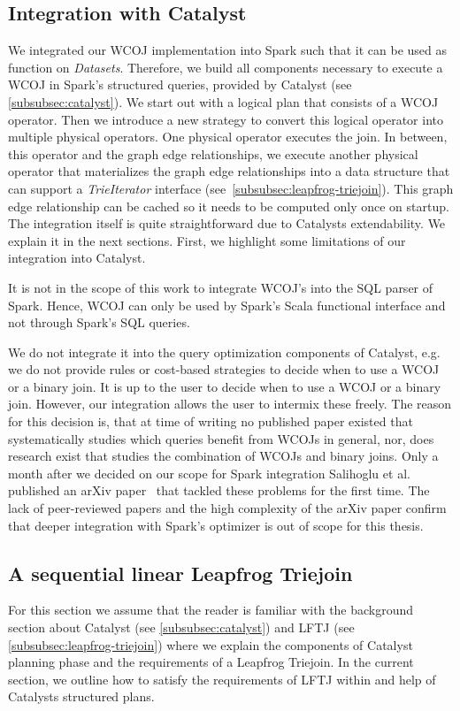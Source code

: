 \subsection{Integration with Catalyst} \label{ssec:integration-with-catalyst}
We integrated our \textsc{WCOJ} implementation into Spark such that it can be used as function on \textit{Datasets}.
Therefore, we build all components necessary to execute a \textsc{WCOJ} in Spark's structured queries, provided by Catalyst (see
\cref{subsubsec:catalyst}).
We start out with a logical plan that consists of a \textsc{WCOJ} operator.
Then we introduce a new strategy to convert this logical operator into multiple physical operators.
One physical operator executes the join.
In between, this operator and the graph edge relationships, we execute another physical operator that materializes
the graph edge relationships into a data structure that can support a \textit{TrieIterator} interface
(see~\cref{subsubsec:leapfrog-triejoin}).
This graph edge relationship can be cached so it needs to be computed only once on startup.
The integration itself is quite straightforward due to Catalysts extendability.
We explain it in the next sections.
First, we highlight some limitations of our integration into Catalyst.

It is not in the scope of this work to integrate \textsc{WCOJ}'s into the SQL parser of Spark.
Hence, \textsc{WCOJ} can only be used by Spark's Scala functional interface and not through Spark's SQL queries.

We do not integrate it into the query optimization components of Catalyst, e.g. we do not provide rules or cost-based strategies to
decide when to use a \textsc{WCOJ} or a binary join.
It is up to the user to decide when to use a \textsc{WCOJ} or a binary join.
However, our integration allows the user to intermix these freely.
The reason for this decision is, that at time of writing no published paper existed that systematically studies which queries benefit from
\textsc{WCOJ}s in general, nor, does research exist that studies the combination of \textsc{WCOJ}s and binary joins.
Only a month after we decided on our scope for Spark integration Salihoglu et al. published an arXiv paper~\cite{mhedhbi2019} that
tackled these problems for the first time.
The lack of peer-reviewed papers and the high complexity of the arXiv paper confirm that deeper integration with
Spark's optimizer is out of scope for this thesis.

\subsection{A sequential linear Leapfrog Triejoin} \label{subsec:spark-integration-seq}
For this section we assume that the reader is familiar with the background section about Catalyst (see \cref{subsubsec:catalyst}) and
\textsc{LFTJ} (see \cref{subsubsec:leapfrog-triejoin}) where we explain the components of Catalyst planning phase and the requirements
of a Leapfrog Triejoin.
In the current section, we outline how to satisfy the requirements of \textsc{LFTJ} within and help of Catalysts structured plans.


